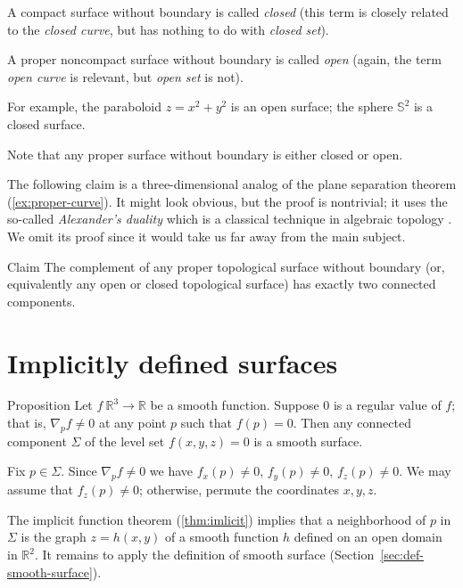 A compact surface without boundary is called \emph{closed}
(this term is closely related to the {}\emph{closed curve}, but has nothing to do with {}\emph{closed set}).

A proper noncompact surface without boundary is called \emph{open} (again, the term {}\emph{open curve} is relevant, but {}\emph{open set} is not).

For example, the paraboloid $z=x^2+y^2$
is an open surface; the 
sphere $\mathbb{S}^2$ is a closed surface.

Note that any proper surface without boundary is either closed or open.

The following claim is a three-dimensional analog of the plane separation theorem (\ref{ex:proper-curve}).
It might look obvious, but the proof is nontrivial; it uses the so-called {}\emph{Alexander's duality} which is a classical technique in algebraic topology \cite[see][]{hatcher}.
We omit its proof since it would take us far away from the main subject.

\begin{thm}{Claim}\label{clm:proper-divides}
The complement of any proper topological surface without boundary (or, equivalently any open or closed topological surface) has exactly two connected components. 
\end{thm}

\section{Implicitly defined surfaces}

\begin{thm}{Proposition}\label{prop:implicit-surface}
Let $f\:\mathbb{R}^3\to \mathbb{R}$ be a smooth function.
Suppose $0$ is a regular value of $f$;
that is, $\nabla_p f\ne 0$ at any point $p$ such that $f(p)=0$.
Then any connected component $\Sigma$ of the level set  $f(x,y,z)=0$ is a smooth surface.
\end{thm}

Fix $p\in\Sigma$.
Since $\nabla_p f\ne 0$ we have 
$f_x(p)\ne 0$,
$f_y(p)\ne 0$,
$f_z(p)\ne 0$.
We may assume that $f_z(p)\ne 0$;
otherwise, permute the coordinates $x,y,z$.

The implicit function theorem (\ref{thm:imlicit}) implies that a neighborhood of $p$ in $\Sigma$ is the graph $z=h(x,y)$ of a smooth function $h$ defined on an open domain in $\mathbb{R}^2$.
It remains to apply the definition of smooth surface (Section~\ref{sec:def-smooth-surface}).
\qeds

